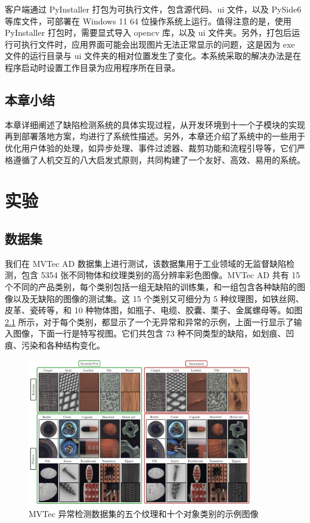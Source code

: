 \documentclass[
  ]{njuthesis}
\begin{document}
客户端通过 PyInstaller 打包为可执行文件，包含源代码、ui 文件，以及 PySide6 等库文件，可部署在 Windows 11 64 位操作系统上运行。值得注意的是，使用 PyInstaller 打包时，需要显式导入 opencv 库，以及 ui 文件夹。另外，打包后运行可执行文件时，应用界面可能会出现图片无法正常显示的问题，这是因为 exe 文件的运行目录与 ui 文件夹的相对位置发生了变化。本系统采取的解决办法是在程序启动时设置工作目录为应用程序所在目录。

\section{本章小结}

本章详细阐述了缺陷检测系统的具体实现过程，从开发环境到十一个子模块的实现再到部署落地方案，均进行了系统性描述。另外，本章还介绍了系统中的一些用于优化用户体验的处理，如异步处理、事件过滤器、裁剪功能和流程引导等，它们严格遵循了人机交互的八大启发式原则，共同构建了一个友好、高效、易用的系统。

\chapter{实验}

\section{数据集}

我们在 MVTec AD 数据集上进行测试，该数据集用于工业领域的无监督缺陷检测，包含 5354 张不同物体和纹理类别的高分辨率彩色图像。MVTec AD 共有 15 个不同的产品类别，每个类别包括一组无缺陷的训练集，和一组包含各种缺陷的图像以及无缺陷的图像的测试集。这 15 个类别又可细分为 5 种纹理图，如铁丝网、皮革、瓷砖等，和 10 种物体图，如瓶子、电缆、胶囊、栗子、金属螺母等。如图 \ref{MVTec} 所示，对于每个类别，都显示了一个无异常和异常的示例，上面一行显示了输入图像，下面一行是特写视图。它们共包含 73 种不同类型的缺陷，如划痕、凹痕、污染和各种结构变化。

\begin{figure}[htb]
    \centering
    \includegraphics[width=0.88\textwidth]{images/MVTec.png}
    \caption{MVTec 异常检测数据集的五个纹理和十个对象类别的示例图像}
    \label{MVTec}
\end{figure}
\end{document}
